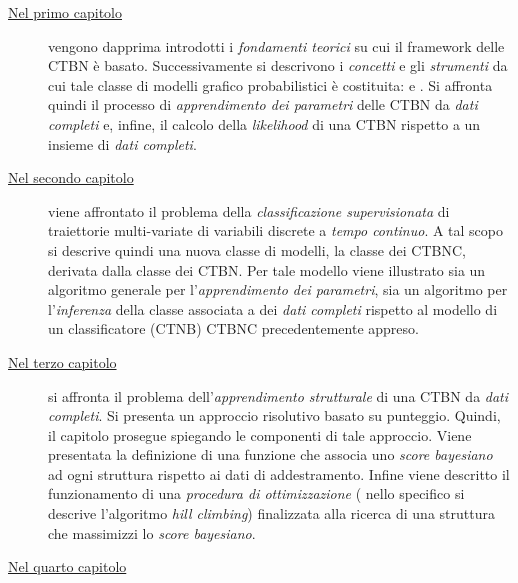 \begin{description}
	\item[{\hyperref[cap:ctbn]{Nel primo capitolo}}]
	vengono dapprima introdotti i \emph{fondamenti teorici} su cui il framework delle \acf{CTBN} è basato. Successivamente si descrivono i \emph{concetti} e gli \emph{strumenti} da cui tale classe di modelli grafico probabilistici è costituita: \emph{\cim{}} e \emph{\stats{}}. Si affronta quindi il processo di \emph{apprendimento dei parametri} delle \acs{CTBN} da \emph{dati completi} e, infine, il calcolo della \emph{likelihood} di una \acs{CTBN} rispetto a un insieme di \emph{dati completi}.
	\item[{\hyperref[cap:ctbnc]{Nel secondo capitolo}}]
	viene affrontato il problema della \emph{classificazione supervisionata} di traiettorie multi-variate di variabili discrete a \emph{tempo continuo}. A tal scopo si descrive quindi una nuova classe di modelli, la classe dei \acf{CTBNC}, derivata dalla classe dei \acs{CTBN}. Per tale modello viene illustrato sia un algoritmo generale per l'\emph{apprendi\-mento dei parametri}, sia un algoritmo per l'\emph{inferenza} della classe associata a dei \emph{dati completi} rispetto al modello di un classificatore (\acs{CTNB}) \acs{CTBNC} precedentemente appreso.
	\item[{\hyperref[cap:structurallearning]{Nel terzo capitolo}}]
	si affronta il problema dell'\emph{apprendimento strutturale} di una \acs{CTBN} da \emph{dati completi}. Si presenta un approccio risolutivo basato su punteggio. Quindi, il capitolo prosegue spiegando le componenti di tale approccio. Viene presentata la definizione di una funzione che associa uno \emph{score bayesiano} ad ogni struttura rispetto ai dati di addestramento. Infine viene descritto il funzionamento di una \emph{procedura di ottimizzazione} (\ie{} nello specifico si descrive l'algoritmo \emph{hill climbing}) finalizzata alla ricerca di una struttura che massimizzi lo \emph{score bayesiano}.
	\item[{\hyperref[cap:ctbnr]{Nel quarto capitolo}}]
	\omissis{}

\end{description}
